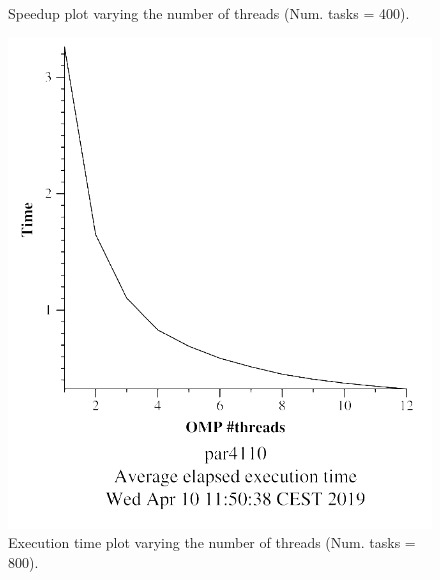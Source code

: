 \documentclass[12pt, a4paper]{article}
\begin{document}
\begin{figure}[H]
\begin{minipage}[b]{0.4\linewidth}
  \caption{Speedup plot varying the number of threads (Num. tasks = 400).}
  \label{fig:mandel-omp-10000-strong-omp-3-400-speedup}
\end{minipage}
\end{figure}

\begin{figure}[H]
\centering
\begin{minipage}[b]{0.4\linewidth}
  \centering
  \includegraphics[scale=0.5]{./mandel-omp-10000-strong-omp-3-800-time}
  \caption{Execution time plot varying the number of threads (Num. tasks = 800).}
  \label{fig:mandel-omp-10000-strong-omp-3-800-time}
\end{minipage}%
\hspace{0.5cm}
\begin{minipage}[b]{0.4\linewidth}
  \centering

\end{minipage}
\end{figure}
\end{document}
